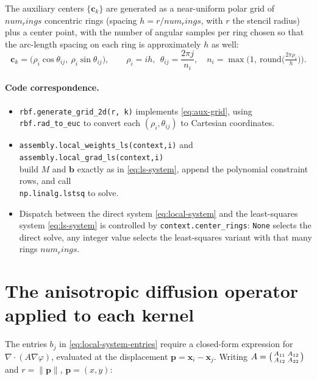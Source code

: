 \documentclass[11pt]{article}
\newcommand{\bp}{\mathbf{p}}
\newcommand{\bx}{\mathbf{x}}
\newcommand{\bc}{\mathbf{c}}
\newcommand{\diver}{\nabla\!\cdot}
\newcommand{\grad}{\nabla}
\begin{document}
The auxiliary centers $\{\bc_k\}$ are generated as a near-uniform
polar grid of $num_rings$ concentric rings (spacing $h = r/num_rings$, with $r$ the
stencil radius) plus a center point, with the number of angular
samples per ring chosen so that the arc-length spacing on each ring is
approximately $h$ as well:
\begin{equation}
  \bc_k = \big(\rho_i \cos\theta_{ij},\ \rho_i \sin\theta_{ij}\big),
  \qquad \rho_i = ih,\ \ \theta_{ij} = \frac{2\pi j}{n_i},
  \quad n_i = \max\!\Big(1,\ \mathrm{round}\big(\tfrac{2\pi\rho_i}{h}\big)\Big).
  \label{eq:aux-grid}
\end{equation}

\paragraph{Code correspondence.}
\begin{itemize}[leftmargin=2em]
  \item \texttt{rbf.generate\_grid\_2d(r, k)} implements
        \eqref{eq:aux-grid}, using \texttt{rbf.rad\_to\_euc} to convert
        each $(\rho_i, \theta_{ij})$ to Cartesian coordinates.
  \item \texttt{assembly.local\_weights\_ls(context,i)} and
        \texttt{assembly.local\_grad\_ls(context,i)} \\ build $M$ and
        $\mathbf{b}$ exactly as in \eqref{eq:ls-system}, append the
        polynomial constraint rows, and call \\
        \texttt{np.linalg.lstsq} to solve.
  \item Dispatch between the direct system \eqref{eq:local-system} and
        the least-squares system \eqref{eq:ls-system} is controlled by
        \texttt{context.center\_rings}: \texttt{None} selects the
        direct solve, any integer value selects the least-squares
        variant with that many rings $num_rings$.
\end{itemize}

\section{The anisotropic diffusion operator applied to each kernel}
\label{sec:aniso-op}

The entries $b_j$ in \eqref{eq:local-system-entries} require a
closed-form expression for $\diver(A\grad\varphi)$, evaluated at the
displacement $\bp = \bx_i - \bx_j$. Writing $A = \begin{psmallmatrix}
A_{11} & A_{12} \\ A_{12} & A_{22} \end{psmallmatrix}$ and
$r = \|\bp\|$, $\bp = (x,y)$:
\end{document}
